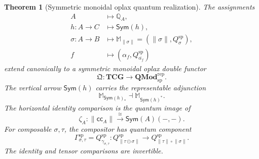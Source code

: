\documentclass[oneside]{article}
\newcommand{\Sym}{\mathsf{Sym}}
\newcommand{\cc}{\mathsf{cc}}
\theoremstyle{plain}
\newtheorem{theorem}{Theorem}[section]
\theoremstyle{definition}
\theoremstyle{remark}
\begin{document}
\begin{theorem}[Symmetric monoidal oplax quantum realization]
\label{thm:cgqg-master-quantum-double-functor}
The assignments
\begin{align}
 A&\longmapsto\mathbb Q_A,\\
 h:A\to C&\longmapsto\Sym(h),\\
 \sigma:A\to B&\longmapsto
       \mathbb M_{\lVert\sigma\rVert}
       =(\lVert\sigma\rVert,Q_\sigma^{\mathrm{sp}}),\\
 f&\longmapsto(\alpha_f,Q_{\overline{\alpha_f}}^{\mathrm{sp}})
\end{align}
extend canonically to a symmetric monoidal oplax double functor
\begin{equation}
 \mathfrak Q:\mathbf{TCG}\longrightarrow
       \mathbf{QMod}^{\mathrm{rep}}_{\mathrm{sp}}.
 \label{eq:cgqg-master-double-functor}
\end{equation}
The vertical arrow \(\Sym(h)\) carries the representable adjunction
\[
 \mathbb M_{\Sym(h)_*}\dashv\mathbb M_{\Sym(h)^*}.
\]
The horizontal identity comparison is the quantum image of
\begin{equation}
 \zeta_A:\lVert\cc_A\rVert\xrightarrow{\cong}\Sym(A)(-,-).
 \label{eq:cgqg-master-horizontal-unit-comparison}
\end{equation}
For composable \(\sigma,\tau\), the compositor has quantum component
\begin{equation}
 \Gamma_{\sigma,\tau}^{\mathrm{sp}}
   =Q_{\gamma_{\sigma,\tau}}^{\mathrm{sp}}:
 Q_{\lVert\tau\odot\sigma\rVert}^{\mathrm{sp}}
       \longrightarrow
 Q_{\lVert\tau\rVert\circ\lVert\sigma\rVert}^{\mathrm{sp}}.
 \label{eq:cgqg-master-horizontal-compositor}
\end{equation}
The identity and tensor comparisons are invertible.
\end{theorem}
\end{document}
